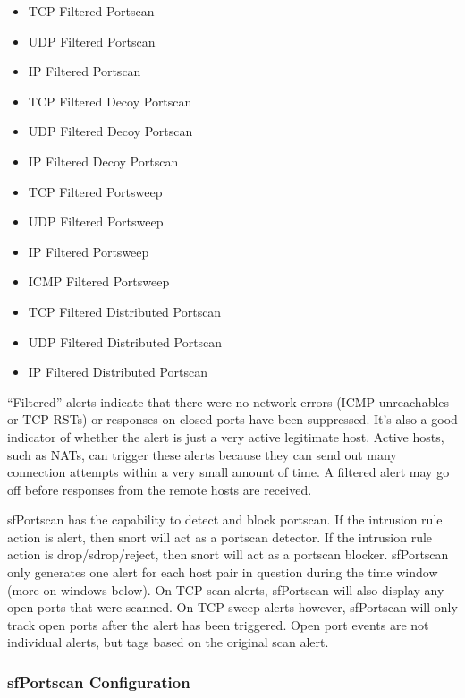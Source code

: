 \documentclass[english]{report}
\begin{document}
\begin{itemize}
\item TCP Filtered Portscan
\item UDP Filtered Portscan
\item IP Filtered Portscan

\item TCP Filtered Decoy Portscan
\item UDP Filtered Decoy Portscan
\item IP Filtered Decoy Portscan

\item TCP Filtered Portsweep
\item UDP Filtered Portsweep
\item IP Filtered Portsweep
\item ICMP Filtered Portsweep

\item TCP Filtered Distributed Portscan
\item UDP Filtered Distributed Portscan
\item IP Filtered Distributed Portscan
\end{itemize}

``Filtered'' alerts indicate that there were no network errors (ICMP
unreachables or TCP RSTs) or responses on closed ports have been suppressed.
It's also a good indicator of whether the alert is just a very active
legitimate host. Active hosts, such as NATs, can trigger these alerts because
they can send out many connection attempts within a very small amount of time.
A filtered alert may go off before responses from the remote hosts are
received.

sfPortscan has the capability to detect and block portscan. If the intrusion rule
action is alert, then snort will act as a portscan detector. If the intrusion
rule action is drop/sdrop/reject, then snort will act as a portscan blocker.
sfPortscan only generates one alert for each host pair in question during the
time window (more on windows below). On TCP scan alerts, sfPortscan will also
display any open ports that were scanned. On TCP sweep alerts however,
sfPortscan will only track open ports after the alert has been triggered. Open
port events are not individual alerts, but tags based on the original scan
alert.

\subsubsection{sfPortscan Configuration}
\end{document}
